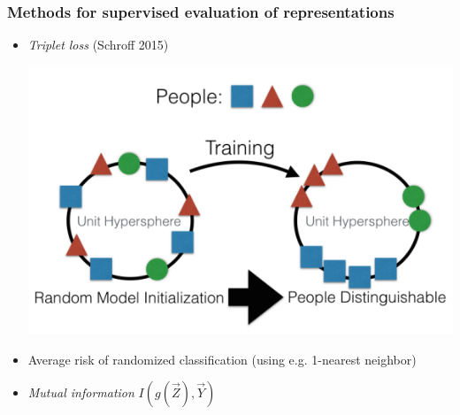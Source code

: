 \documentclass{beamer}
\begin{document}
\begin{frame}
\frametitle{Methods for supervised evaluation of representations}
\begin{itemize}
\item \emph{Triplet loss} (Schroff 2015)
\begin{center}
\includegraphics[scale = 0.3]{../info_theory_paper/thesis_2/Figures/triplet_loss.png}
\end{center}
\pause
\item Average risk of randomized classification (using e.g. 1-nearest neighbor)\pause
\item \emph{Mutual information} $I(g(\vec{Z}), \vec{Y})$
\end{itemize}

\end{frame}
\end{document}
